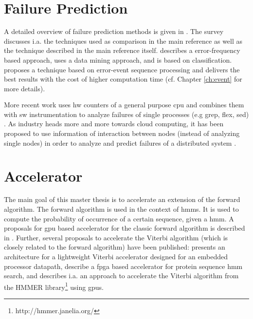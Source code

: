 \documentclass[mscthesis]{usiinfthesis}
\begin{document}
\section{Failure Prediction}
\label{ch:art_pred}
A detailed overview of failure prediction methods is given in
\cite{ACM10_Salfner}. The survey discusses i.a. the techniques used as
comparison in the main reference
\cite{lin88,IEEE90_lin,ICDM02_Vilalta,domeniconi02} as well as the technique
described in the main reference \cite{salfner08} itself. \cite{lin88} describes
a error-frequency based approach, \cite{ICDM02_Vilalta} uses a data mining
approach, and \cite{domeniconi02} is based on classification. \cite{salfner08}
proposes a technique based on error-event sequence processing and delivers
the best results with the cost of higher computation time (cf. Chapter
\ref{ch:event} for more details).

More recent work uses \gls{hw} counters of a general purpose \gls{cpu} and
combines them with \gls{sw} instrumentation to analyze failures of single
processes (e.g grep, flex, sed) \cite{FSE10_Yilmaz}. As industry heads more and
more towards cloud computing, it has been proposed to use information of
interaction between nodes (instead of analyzing single nodes) in order to
analyze and predict failures of a distributed system
\cite{IEEE12_Salfner,DSN10_Oliner}.

\section{Accelerator}
\label{ch:art_acc}

The main goal of this master thesis is to accelerate an extension of the
forward algorithm. The forward algorithm is used in the context of \glspl{hmm}.
It is used to compute the probability of occurrence of a certain sequence,
given a \gls{hmm}. A proposals for \gls{gpu} based accelerator for the classic
forward algorithm is described in \cite{liu09}. Further, several proposals to
accelerate the Viterbi algorithm (which is closely related to the forward
algorithm) have been published: \cite{ASAP12_Azhar} presents an architecture
for a lightweight Viterbi accelerator designed for an embedded processor
datapath, \cite{IPDPS07_Jacob,ICS06_Maddimsetty,IPDPS07_Oliver} describe
a \gls{fpga} based accelerator for protein sequence \gls{hmm} search, and
\cite{IPDPS09_Walters} describes i.a. an approach to accelerate the Viterbi
algorithm from the HMMER library\footnote{http://hmmer.janelia.org/} using
\glspl{gpu}.
\end{document}
